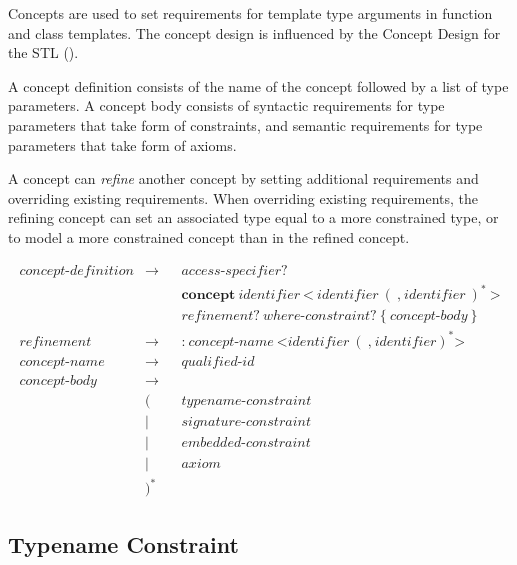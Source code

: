 \documentclass[a4paper,oneside,11pt]{article}
\begin{document}
Concepts are used to set requirements for template type arguments in function and class templates.
The concept design is influenced by the Concept Design for the STL (\cite{STLCONCEPTS}).

A concept definition consists of the name of the concept followed by a list of type parameters.
A concept body consists of syntactic requirements for type parameters that take form of constraints,
and semantic requirements for type parameters that take form of axioms.

A concept can \emph{refine} another concept by setting additional requirements and overriding existing requirements.
When overriding existing requirements, the refining concept can set an associated type equal to a more constrained type,
or to model a more constrained concept than in the refined concept.

\begin{align*}
concept\textrm{-}definition &\rightarrow & &\hyperref[accessspecifier]{access\textrm{-}specifier}?\\
& & &\textbf{concept} \> \hyperref[identifier]{identifier} \> \texttt{<} \> \hyperref[identifier]{identifier} \> (\> \texttt{,} \>
\hyperref[identifier]{identifier} \>)^* \> \texttt{>}\\
& & &refinement? \> \hyperref[whereconstraint]{where\textrm{-}constraint}? \> \texttt{\{} \> concept\textrm{-}body \> \texttt{\}}\\
refinement &\rightarrow & &\texttt{:} \> concept\textrm{-}name \> \texttt{<} \hyperref[identifier]{identifier} \>
(\> \texttt{,} \> \hyperref[identifier]{identifier})^* \texttt{>}\\
concept\textrm{-}name &\rightarrow & &\hyperref[qualifiedid]{qualified\textrm{-}id}\\
concept\textrm{-}body &\rightarrow\\
&( & &\hyperref[typenameconstraint]{typename\textrm{-}constraint}\\
&| & &\hyperref[signatureconstraint]{signature\textrm{-}constraint}\\
&| & &\hyperref[embeddedconstraint]{embedded\textrm{-}constraint}\\
&| & &\hyperref[axiom]{axiom}\\
&)^*
\end{align*}

\subsection{Typename Constraint}\label{typenameconstraint}
\end{document}
